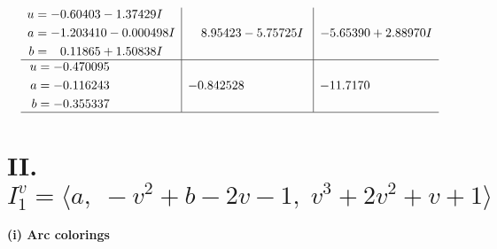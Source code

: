 \documentclass[1p]{elsarticle_modified}
\theoremstyle{definition}
\begin{document}
$$\begin{array}{c|c|c}
\begin{aligned}
u &= -0.60403 - 1.37429 I \\
a &= -1.203410 - 0.000498 I \\
b &= \phantom{-}0.11865 + 1.50838 I\end{aligned}
 & \phantom{-}8.95423 - 5.75725 I & -5.65390 + 2.88970 I \\ \hline\begin{aligned}
u &= -0.470095\phantom{ +0.000000I} \\
a &= -0.116243\phantom{ +0.000000I} \\
b &= -0.355337\phantom{ +0.000000I}\end{aligned}
 & -0.842528\phantom{ +0.000000I} & -11.7170\phantom{ +0.000000I}\\
 \hline 
 \end{array}$$\newpage\newpage\renewcommand{\arraystretch}{1}
\centering \section*{II. $I^v_{1}= \langle a,\;- v^2+b-2 v-1,\;v^3+2 v^2+v+1 \rangle$}
\flushleft \textbf{(i) Arc colorings}\\
\end{document}
